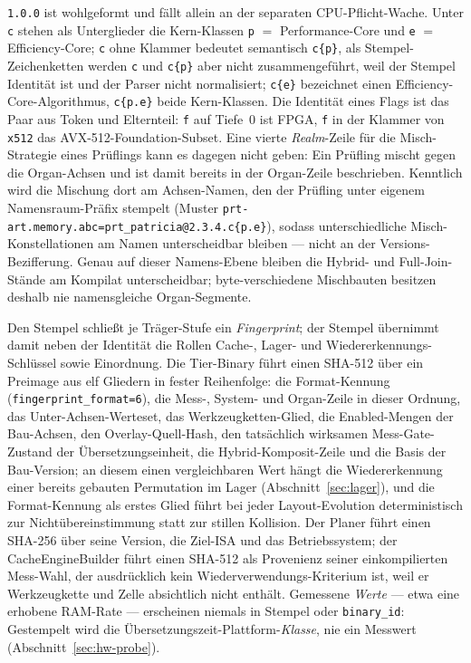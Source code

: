 \begin{nurlang}
\texttt{1.0.0} ist wohlgeformt und fällt allein an der separaten CPU-Pflicht-Wache. Unter \texttt{c} stehen
als Unterglieder die Kern-Klassen \texttt{p} $=$ Performance-Core und \texttt{e} $=$ Efficiency-Core;
\texttt{c} ohne Klammer bedeutet semantisch \texttt{c\{p\}}, als Stempel-Zeichenketten werden \texttt{c}
und \texttt{c\{p\}} aber nicht zusammengeführt, weil der Stempel Identität ist und der Parser nicht
normalisiert; \texttt{c\{e\}} bezeichnet einen Efficiency-Core-Algorithmus, \texttt{c\{p.e\}} beide
Kern-Klassen. Die Identität eines Flags ist das Paar aus Token und Elternteil: \texttt{f} auf Tiefe~0 ist
FPGA, \texttt{f} in der Klammer von \texttt{x512} das AVX-512-Foundation-Subset.
Eine vierte \emph{Realm}-Zeile für die Misch-Strategie eines Prüflings kann es dagegen nicht geben: Ein
Prüfling mischt gegen die Organ-Achsen und ist damit bereits in der Organ-Zeile beschrieben. Kenntlich
wird die Mischung dort am Achsen-Namen, den der Prüfling unter eigenem Namensraum-Präfix stempelt
(Muster \texttt{prt-art.memory.abc=prt\_patricia@2.3.4.c\{p.e\}}), sodass unterschiedliche
Misch-Konstellationen am Namen unterscheidbar bleiben --- nicht an der Versions-Bezifferung. Genau auf
dieser Namens-Ebene bleiben die Hybrid- und Full-Join-Stände am Kompilat unterscheidbar; byte-verschiedene
Mischbauten besitzen deshalb nie namensgleiche Organ-Segmente.

Den Stempel schließt je Träger-Stufe ein \emph{Fingerprint}; der Stempel übernimmt damit neben der
Identität die Rollen Cache-, Lager- und Wiedererkennungs-Schlüssel sowie Einordnung. Die Tier-Binary führt einen
SHA-512 über ein Preimage aus elf Gliedern in fester Reihenfolge: die Format-Kennung
(\texttt{fingerprint\_format=6}), die Mess-, System- und Organ-Zeile in dieser Ordnung, das
Unter-Achsen-Werteset, das Werkzeugketten-Glied, die Enabled-Mengen der Bau-Achsen, den
Overlay-Quell-Hash, den tatsächlich wirksamen Mess-Gate-Zustand der Übersetzungseinheit, die
Hybrid-Komposit-Zeile und die Basis der Bau-Version; an diesem einen vergleichbaren Wert hängt die
Wiedererkennung einer bereits gebauten Permutation im Lager (Abschnitt~\ref{sec:lager}), und die
Format-Kennung als erstes Glied führt bei jeder Layout-Evolution deterministisch zur Nichtübereinstimmung
statt zur stillen Kollision. Der Planer führt einen SHA-256 über seine Version, die Ziel-ISA und das Betriebssystem;
der CacheEngineBuilder führt einen SHA-512 als Provenienz seiner einkompilierten Mess-Wahl, der
ausdrücklich kein Wiederverwendungs-Kriterium ist, weil er Werkzeugkette und Zelle absichtlich nicht
enthält. Gemessene \emph{Werte} --- etwa eine erhobene RAM-Rate --- erscheinen niemals in Stempel oder
\texttt{binary\_id}: Gestempelt wird die Übersetzungszeit-Plattform-\emph{Klasse}, nie ein Messwert
(Abschnitt~\ref{sec:hw-probe}).

\end{nurlang}
